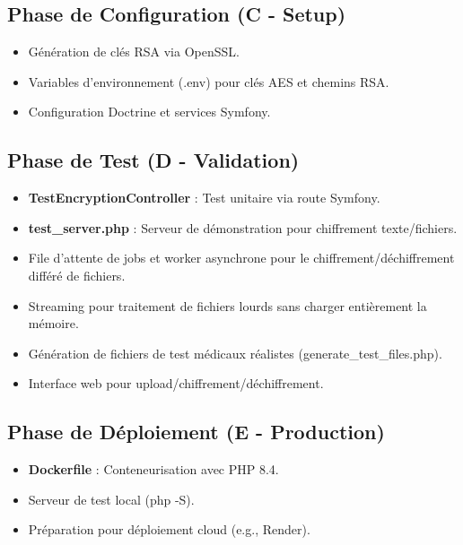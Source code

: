 \documentclass{article}
\begin{document}
\subsection{Phase de Configuration (C - Setup)}
\begin{itemize}
    \item Génération de clés RSA via OpenSSL.
    \item Variables d'environnement (.env) pour clés AES et chemins RSA.
    \item Configuration Doctrine et services Symfony.
\end{itemize}

\subsection{Phase de Test (D - Validation)}
\begin{itemize}
    \item \textbf{TestEncryptionController} : Test unitaire via route Symfony.
    \item \textbf{test\_server.php} : Serveur de démonstration pour chiffrement texte/fichiers.
    \item File d'attente de jobs et worker asynchrone pour le chiffrement/déchiffrement différé de fichiers.
    \item Streaming pour traitement de fichiers lourds sans charger entièrement la mémoire.
    \item Génération de fichiers de test médicaux réalistes (generate\_test\_files.php).
    \item Interface web pour upload/chiffrement/déchiffrement.
\end{itemize}

\subsection{Phase de Déploiement (E - Production)}
\begin{itemize}
    \item \textbf{Dockerfile} : Conteneurisation avec PHP 8.4.
    \item Serveur de test local (php -S).
    \item Préparation pour déploiement cloud (e.g., Render).
\end{itemize}
\end{document}
